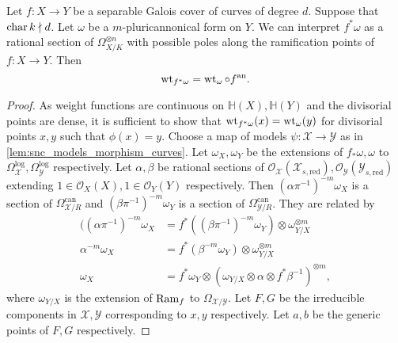 \begin{theorem}\label{prop:weightfunction_fullback}
	Let $f: X \to Y$ be a separable Galois cover of curves of degree $d$. 
	Suppose that $\operatorname{char} k \nmid d$. 
	Let $\omega $ be a $m$-pluricannonical form on $Y$. 
	We can interpret $f^*\omega$ as a rational section of $\Omega_{X / K}^{\otimes n}$ with possible poles along the ramification points of $f: X \to Y$. 
	Then \[
		\operatorname{wt}_{f^*\omega} = \operatorname{wt}_{\omega} \circ f{}^{\text{an}}
	.\] 
\end{theorem}
\begin{proof}
	As weight functions are continuous on $\mathbb{H}(X), \mathbb{H}(Y)$ and the divisorial points are dense, it is sufficient to show that $\operatorname{wt}_{f^* \omega}(x) = \operatorname{wt}_{\omega}(y)$ 
	for divisorial points  $x, y$ such that $\phi(x) = y$. 
	Choose a map of models $\psi: \mathscr X \to \mathscr Y$ as in \cref{lem:snc_models_morphism_curves}.  
	Let $\omega_X, \omega_Y$ be the extensions of $f_*\omega, \omega$ to $\Omega^{\text{log}}_{\mathscr X}, \Omega^{\text{log}}_{\mathscr Y}$ respectively. 
	Let $\alpha, \beta$ be rational sections of $\mathcal{O}_{\mathscr X}(\mathscr X_{s, \text{red}}), \mathcal{O}_{\mathscr Y}(\mathscr Y_{s, \text{red}} )$ extending $1 \in \mathcal{O}_X(X), 1 \in \mathcal{O}_Y(Y)$ respectively. 
	Then $(\alpha \pi^{-1})^{-m}\omega_{X}$ is a section of $\Omega^{\text{can}}_{\mathscr X / R}$ and $(\beta\pi^{-1})^{-m} \omega_{Y}$ is a section of $\Omega^{\text{can}}_{\mathscr Y / R}$. 
	They are related by \begin{align*}
		((\alpha \pi^{-1})^{-m} \omega_X &= f^*((\beta \pi^{-1})^{-m}\omega_Y) \otimes \omega_{Y / X}^{\otimes m} \\
		\alpha ^{-m} \omega_X &= f^*(\beta ^{-m}\omega_Y) \otimes \omega_{Y / X}^{\otimes m} \\
		\omega_{X} &= f^* \omega_{Y} \otimes (\omega_{Y / X} \otimes \alpha \otimes f^*\beta ^{-1})^{\otimes m}
	,\end{align*} 
	where $\omega_{ Y /  X}$ is the extension of $\operatorname{Ram}_f$ to $\Omega_{\mathscr X / \mathscr Y}$.
	Let $F, G$ be the irreducible components in $\mathscr X, \mathscr Y$ corresponding to $x, y$ respectively. 
	Let $a, b$ be the generic points of $F, G$ respectively. 


\end{proof}
